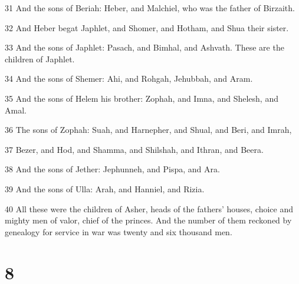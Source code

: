 \par 31 And the sons of Beriah: Heber, and Malchiel, who was the father of Birzaith.
\par 32 And Heber begat Japhlet, and Shomer, and Hotham, and Shua their sister.
\par 33 And the sons of Japhlet: Pasach, and Bimhal, and Ashvath. These are the children of Japhlet.
\par 34 And the sons of Shemer: Ahi, and Rohgah, Jehubbah, and Aram.
\par 35 And the sons of Helem his brother: Zophah, and Imna, and Shelesh, and Amal.
\par 36 The sons of Zophah: Suah, and Harnepher, and Shual, and Beri, and Imrah,
\par 37 Bezer, and Hod, and Shamma, and Shilshah, and Ithran, and Beera.
\par 38 And the sons of Jether: Jephunneh, and Pispa, and Ara.
\par 39 And the sons of Ulla: Arah, and Hanniel, and Rizia.
\par 40 All these were the children of Asher, heads of the fathers' houses, choice and mighty men of valor, chief of the princes. And the number of them reckoned by genealogy for service in war was twenty and six thousand men.

\chapter{8}

